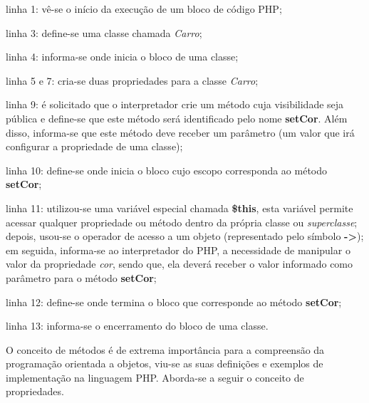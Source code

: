 \begin{alineas}
    \item linha 1: vê-se o início da execução de um bloco de código PHP;
    \item linha 3: define-se uma classe chamada \textit{Carro};
    \item linha 4: informa-se onde inicia o bloco de uma classe;
    \item linha 5 e 7: cria-se duas propriedades para a classe
    \textit{Carro};
    \item linha 9: é solicitado que o interpretador crie um método
    cuja visibilidade seja pública e define-se que este método será identificado
    pelo nome \textbf{setCor}.
    Além disso, informa-se que este método deve receber um parâmetro (um valor
    que  irá configurar a propriedade de uma classe);
    \item linha 10: define-se onde inicia o bloco cujo escopo
    corresponda ao método \textbf{setCor};
    \item linha 11: utilizou-se uma variável especial chamada
    \textbf{\$this}, esta variável permite acessar qualquer propriedade ou
    método dentro da própria classe ou \textit{superclasse}; depois, usou-se
    o operador de acesso a um objeto (representado pelo símbolo \textbf{->}); em
    seguida, informa-se ao interpretador do \acs{PHP}, a necessidade de
    manipular o valor da propriedade \textit{cor}, sendo que, ela deverá receber o valor
    informado como parâmetro para o método \textbf{setCor};
    \item linha 12: define-se onde termina o bloco que corresponde ao
    método \textbf{setCor};
    \item linha 13: informa-se o encerramento do bloco de uma classe.
\end{alineas}

O conceito de métodos é de extrema importância para a compreensão da programação
orientada a objetos, viu-se as suas definições e exemplos de implementação na
linguagem \acs{PHP}. Aborda-se a seguir o conceito de propriedades.
